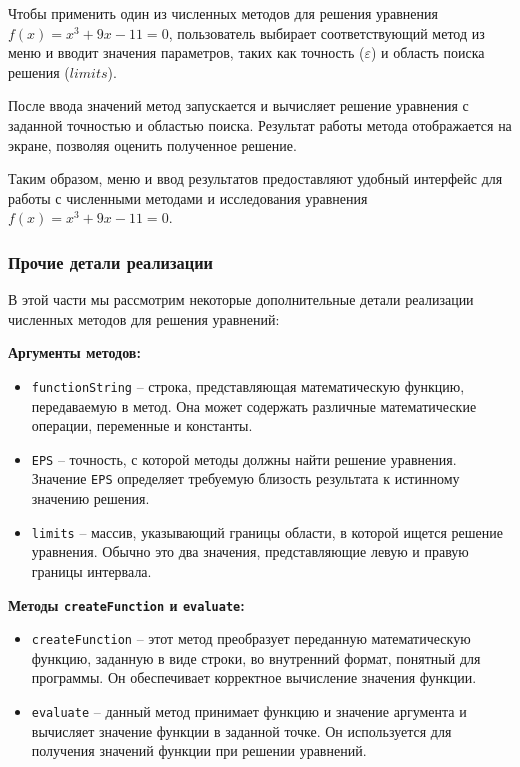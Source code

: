 \documentclass[12pt]{article}
\begin{document}
Чтобы применить один из численных методов для решения уравнения $f(x) = x^3 + 9x - 11 = 0$, пользователь выбирает соответствующий метод из меню и вводит значения параметров, таких как точность ($\varepsilon$) и область поиска решения ($limits$).

После ввода значений метод запускается и вычисляет решение уравнения с заданной точностью и областью поиска. Результат работы метода отображается на экране, позволяя оценить полученное решение.

Таким образом, меню и ввод результатов предоставляют удобный интерфейс для работы с численными методами и исследования уравнения $f(x) = x^3 + 9x - 11 = 0$.

\subsubsection{Прочие детали реализации}
В этой части мы рассмотрим некоторые дополнительные детали реализации численных методов для решения уравнений:

\textbf{Аргументы методов:}
\begin{itemize}
    \item \texttt{functionString} -- строка, представляющая математическую функцию, передаваемую в метод. Она может содержать различные математические операции, переменные и константы.
    \item \texttt{EPS} -- точность, с которой методы должны найти решение уравнения. Значение \texttt{EPS} определяет требуемую близость результата к истинному значению решения.
    \item \texttt{limits} -- массив, указывающий границы области, в которой ищется решение уравнения. Обычно это два значения, представляющие левую и правую границы интервала.
\end{itemize}

\textbf{Методы \texttt{createFunction} и \texttt{evaluate}:}
\begin{itemize}
    \item \texttt{createFunction} -- этот метод преобразует переданную математическую функцию, заданную в виде строки, во внутренний формат, понятный для программы. Он обеспечивает корректное вычисление значения функции.
    \item \texttt{evaluate} -- данный метод принимает функцию и значение аргумента и вычисляет значение функции в заданной точке. Он используется для получения значений функции при решении уравнений.
\end{itemize}
\end{document}
